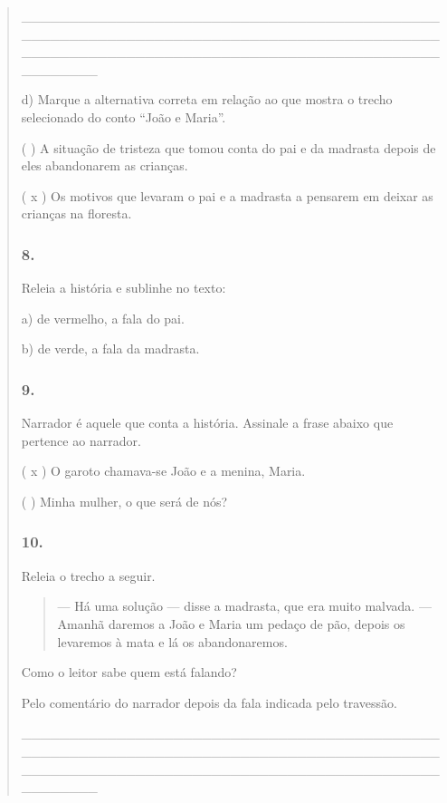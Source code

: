 \begin{quote}
\_\_\_\_\_\_\_\_\_\_\_\_\_\_\_\_\_\_\_\_\_\_\_\_\_\_\_\_\_\_\_\_\_\_\_\_\_\_\_\_\_\_\_\_\_\_\_\_\_\_\_\_\_\_\_\_\_\_\_\_\_\_\_\_\_\_\_\_\_\_\_\_\_\_\_\_\_\_\_\_\_\_\_\_\_\_\_\_\_\_\_\_\_\_\_\_\_\_\_\_\_\_\_\_\_\_\_\_\_\_\_\_\_\_\_\_\_\_\_\_\_\_\_\_\_\_\_\_\_\_\_\_\_\_\_\_\_\_\_\_

d) Marque a alternativa correta em relação ao que mostra o trecho
selecionado do conto ``João e Maria''.

( ) A situação de tristeza que tomou conta do pai e da madrasta depois
de eles abandonarem as crianças.

( x ) Os motivos que levaram o pai e a madrasta a pensarem em deixar as
crianças na floresta.

\subsubsection{8. }\label{section-23}

Releia a história e sublinhe no texto:

a) de vermelho, a fala do pai.

b) de verde, a fala da madrasta.

\subsubsection{9. }\label{section-24}

Narrador é aquele que conta a história. Assinale a frase abaixo que
pertence ao narrador.

( x ) O garoto chamava-se João e a menina, Maria.

( ) Minha mulher, o que será de nós?

\subsubsection{10. }\label{section-25}

Releia o trecho a seguir.

\begin{quote}
--- Há uma solução --- disse a madrasta, que era muito malvada.
--- Amanhã daremos a João e Maria um pedaço de pão, depois os levaremos
à mata e lá os abandonaremos.
\end{quote}

Como o leitor sabe quem está falando?

Pelo comentário do narrador depois da fala indicada pelo travessão.

\_\_\_\_\_\_\_\_\_\_\_\_\_\_\_\_\_\_\_\_\_\_\_\_\_\_\_\_\_\_\_\_\_\_\_\_\_\_\_\_\_\_\_\_\_\_\_\_\_\_\_\_\_\_\_\_\_\_\_\_\_\_\_\_\_\_\_\_\_\_\_\_\_\_\_\_\_\_\_\_\_\_\_\_\_\_\_\_\_\_\_\_\_\_\_\_\_\_\_\_\_\_\_\_\_\_\_\_\_\_\_\_\_\_\_\_\_\_\_\_\_\_\_\_\_\_\_\_\_\_\_\_\_\_\_\_\_\_\_\_


\end{quote}
